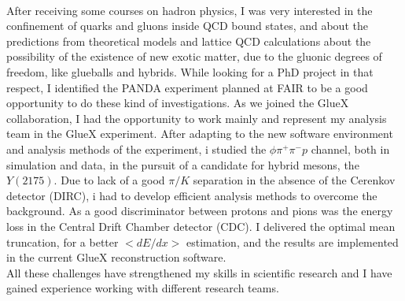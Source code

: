 \documentclass[a4paper,roman]{article}
\begin{document}
~\par After receiving some courses on hadron physics, I was very interested in the confinement of quarks and gluons inside QCD bound states, and about the predictions from theoretical models and lattice QCD calculations about the possibility of the existence of new exotic matter, due to the gluonic degrees of freedom, like glueballs and hybrids. While looking for a PhD project in that respect, I identified the PANDA experiment planned at FAIR to be a good opportunity to do these kind of investigations. As we joined the GlueX collaboration, I had the opportunity to work mainly and represent my analysis team in the GlueX experiment. After adapting to the new software environment and analysis methods of the experiment, i studied the $\phi\pi^{+}\pi^{-}p$ channel, both in simulation and data, in the pursuit of a candidate for hybrid mesons, the $Y(2175)$. Due to lack of a good $\pi/K$ separation in the absence of the Cerenkov detector (DIRC), i had to develop efficient analysis methods to overcome the background. As a good discriminator between protons and pions was the energy loss in the Central Drift Chamber detector (CDC). I delivered the optimal mean truncation, for a better $<dE/dx>$ estimation, and the results are implemented in the current GlueX reconstruction software.\\
All these challenges have strengthened my skills in scientific research and I have gained experience working with different research teams.
\end{document}
